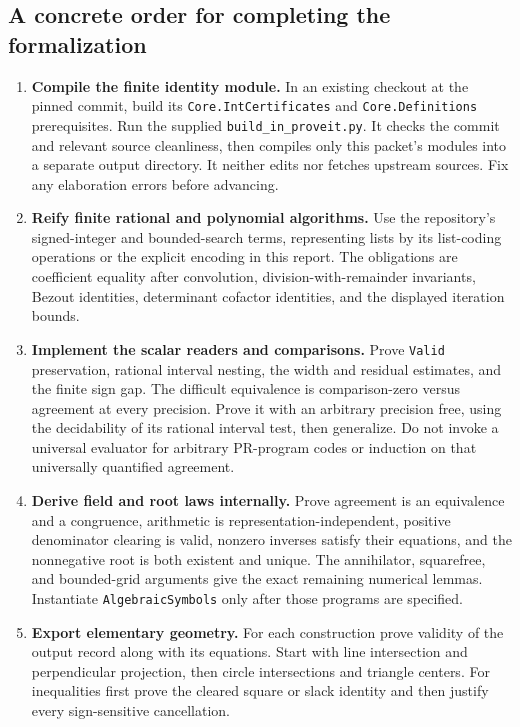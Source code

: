 \subsection{A concrete order for completing the formalization}
\begin{enumerate}
\item \textbf{Compile the finite identity module.} In an existing checkout
at the pinned commit, build its \texttt{Core.IntCertificates} and
\texttt{Core.Definitions} prerequisites. Run the supplied
\texttt{build\_in\_proveit.py}. It checks the commit and relevant source
cleanliness, then compiles only this packet's modules into a separate
output directory. It neither edits nor fetches upstream sources.
Fix any elaboration errors before advancing.
\item \textbf{Reify finite rational and polynomial algorithms.} Use the
repository's signed-integer and bounded-search terms, representing
lists by its list-coding operations or the explicit encoding in this
report. The obligations are coefficient equality after convolution,
division-with-remainder invariants, Bezout identities, determinant
cofactor identities, and the displayed iteration bounds.
\item \textbf{Implement the scalar readers and comparisons.} Prove
\texttt{Valid} preservation, rational interval nesting, the width and
residual estimates, and the finite sign gap. The difficult equivalence is
comparison-zero versus agreement at every precision. Prove it with an
arbitrary precision free, using the decidability of its rational interval
test, then generalize. Do not invoke a universal evaluator for arbitrary
PR-program codes or induction on that universally quantified agreement.
\item \textbf{Derive field and root laws internally.} Prove agreement is
an equivalence and a congruence, arithmetic is representation-independent,
positive denominator clearing is valid, nonzero inverses satisfy their
equations, and the nonnegative root is both existent and unique.
The annihilator, squarefree, and bounded-grid arguments give the exact
remaining numerical lemmas. Instantiate \texttt{AlgebraicSymbols} only
after those programs are specified.
\item \textbf{Export elementary geometry.} For each construction prove
validity of the output record along with its equations. Start with line
intersection and perpendicular projection, then circle intersections and
triangle centers. For inequalities first prove the cleared square or
slack identity and then justify every sign-sensitive cancellation.

\end{enumerate}
